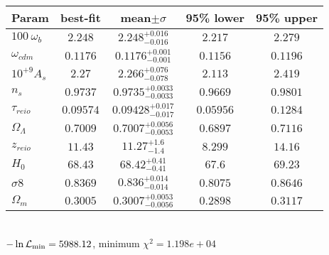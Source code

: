 \begin{tabular}{|l|c|c|c|c|} 
 \hline 
Param & best-fit & mean$\pm\sigma$ & 95\% lower & 95\% upper \\ \hline 
$100~\omega_{b }$ &$2.248$ & $2.248_{-0.016}^{+0.016}$ & $2.217$ & $2.279$ \\ 
$\omega_{cdm }$ &$0.1176$ & $0.1176_{-0.001}^{+0.001}$ & $0.1156$ & $0.1196$ \\ 
$10^{+9}A_{s }$ &$2.27$ & $2.266_{-0.078}^{+0.076}$ & $2.113$ & $2.419$ \\ 
$n_{s }$ &$0.9737$ & $0.9735_{-0.0033}^{+0.0033}$ & $0.9669$ & $0.9801$ \\ 
$\tau_{reio }$ &$0.09574$ & $0.09428_{-0.017}^{+0.017}$ & $0.05956$ & $0.1284$ \\ 
$\Omega_{\Lambda }$ &$0.7009$ & $0.7007_{-0.0053}^{+0.0056}$ & $0.6897$ & $0.7116$ \\ 
$z_{reio }$ &$11.43$ & $11.27_{-1.4}^{+1.6}$ & $8.299$ & $14.16$ \\ 
$H_{0 }$ &$68.43$ & $68.42_{-0.41}^{+0.41}$ & $67.6$ & $69.23$ \\ 
$\sigma8$ &$0.8369$ & $0.836_{-0.014}^{+0.014}$ & $0.8075$ & $0.8646$ \\ 
$\Omega_{m }$ &$0.3005$ & $0.3007_{-0.0056}^{+0.0053}$ & $0.2898$ & $0.3117$ \\ 
\hline 
 \end{tabular} \\ 
$-\ln{\cal L}_\mathrm{min} =5988.12$, minimum $\chi^2=1.198e+04$ \\ 
